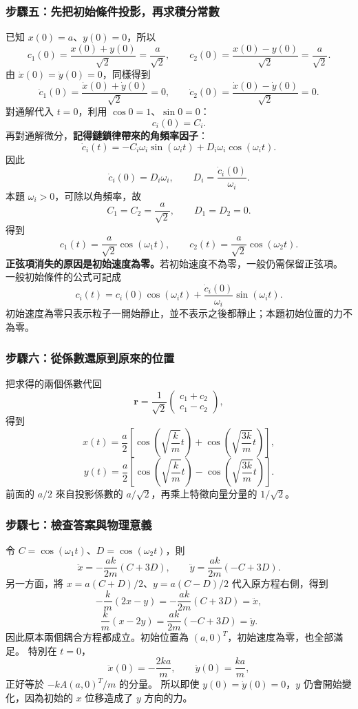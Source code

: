 \documentclass[12pt,a4paper]{article}
\begin{document}
\subsubsection*{步驟五：先把初始條件投影，再求積分常數}
已知 \(x(0)=a\)、\(y(0)=0\)，所以
\[
    c_1(0)=\frac{x(0)+y(0)}{\sqrt2}=\frac a{\sqrt2},\qquad
    c_2(0)=\frac{x(0)-y(0)}{\sqrt2}=\frac a{\sqrt2}.
\]
由 \(\dot x(0)=\dot y(0)=0\)，同樣得到
\[
    \dot c_1(0)=\frac{\dot x(0)+\dot y(0)}{\sqrt2}=0,\qquad
    \dot c_2(0)=\frac{\dot x(0)-\dot y(0)}{\sqrt2}=0.
\]
對通解代入 \(t=0\)，利用 \(\cos0=1\)、\(\sin0=0\)：
\[
    c_i(0)=C_i.
\]
再對通解微分，\textbf{記得鏈鎖律帶來的角頻率因子}：
\[
    \dot c_i(t)=-C_i\omega_i\sin(\omega_it)
    +D_i\omega_i\cos(\omega_it).
\]
因此
\[
    \dot c_i(0)=D_i\omega_i,
    \qquad D_i=\frac{\dot c_i(0)}{\omega_i}.
\]
本題 \(\omega_i>0\)，可除以角頻率，故
\[
    C_1=C_2=\frac a{\sqrt2},\qquad D_1=D_2=0.
\]
得到
\[
    \boxed{c_1(t)=\frac a{\sqrt2}\cos(\omega_1t)},\qquad
    \boxed{c_2(t)=\frac a{\sqrt2}\cos(\omega_2t)}.
\]
\textbf{正弦項消失的原因是初始速度為零。}若初始速度不為零，一般仍需保留正弦項。
一般初始條件的公式可記成
\[
    c_i(t)=c_i(0)\cos(\omega_it)
    +\frac{\dot c_i(0)}{\omega_i}\sin(\omega_it).
\]
初始速度為零只表示粒子一開始靜止，並不表示之後都靜止；本題初始位置的力不為零。

\subsubsection*{步驟六：從係數還原到原來的位置}
把求得的兩個係數代回
\[
    \mathbf r=\frac1{\sqrt2}\begin{pmatrix}c_1+c_2\\c_1-c_2\end{pmatrix},
\]
得到
\[
    \boxed{x(t)=\frac a2\left[
            \cos\left(\sqrt{\frac{k}{m}}t\right)
            +\cos\left(\sqrt{\frac{3k}{m}}t\right)\right]},
\]
\[
    \boxed{y(t)=\frac a2\left[
            \cos\left(\sqrt{\frac{k}{m}}t\right)
            -\cos\left(\sqrt{\frac{3k}{m}}t\right)\right]}.
\]
前面的 \(a/2\) 來自投影係數的 \(a/\sqrt2\)，再乘上特徵向量分量的 \(1/\sqrt2\)。

\subsubsection*{步驟七：檢查答案與物理意義}
令 \(C=\cos(\omega_1t)\)、\(D=\cos(\omega_2t)\)，則
\[
    \ddot x=-\frac{ak}{2m}(C+3D),\qquad
    \ddot y=\frac{ak}{2m}(-C+3D).
\]
另一方面，將 \(x=a(C+D)/2\)、\(y=a(C-D)/2\) 代入原方程右側，得到
\[
    -\frac{k}{m}(2x-y)=-\frac{ak}{2m}(C+3D)=\ddot x,
\]
\[
    \frac{k}{m}(x-2y)=\frac{ak}{2m}(-C+3D)=\ddot y.
\]
因此原本兩個耦合方程都成立。初始位置為 \((a,0)^T\)，初始速度為零，也全部滿足。
特別在 \(t=0\)，
\[
    \ddot x(0)=-\frac{2ka}{m},\qquad \ddot y(0)=\frac{ka}{m},
\]
正好等於 \(-kA(a,0)^T/m\) 的分量。
所以即使 \(y(0)=\dot y(0)=0\)，\(y\) 仍會開始變化，因為初始的 \(x\) 位移造成了 \(y\) 方向的力。
\end{document}
